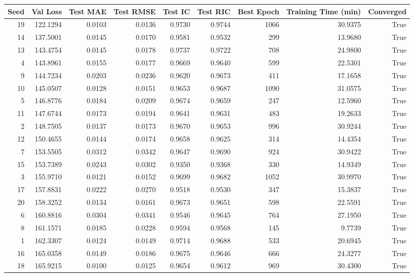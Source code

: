 \begin{tabular}{rrrrrrrrr}
\toprule
Seed & Val Loss & Test MAE & Test RMSE & Test IC & Test RIC & Best Epoch & Training Time (min) & Converged \\
\midrule
19 & 122.1294 & 0.0103 & 0.0136 & 0.9730 & 0.9744 & 1066 & 30.9375 & True \\
14 & 137.5001 & 0.0145 & 0.0170 & 0.9581 & 0.9532 & 299 & 13.9680 & True \\
13 & 143.4754 & 0.0145 & 0.0178 & 0.9737 & 0.9722 & 708 & 24.9800 & True \\
4 & 143.8961 & 0.0155 & 0.0177 & 0.9669 & 0.9640 & 599 & 22.5301 & True \\
9 & 144.7234 & 0.0203 & 0.0236 & 0.9620 & 0.9673 & 411 & 17.1658 & True \\
10 & 145.0507 & 0.0128 & 0.0151 & 0.9653 & 0.9687 & 1090 & 31.0575 & True \\
5 & 146.8776 & 0.0184 & 0.0209 & 0.9674 & 0.9659 & 247 & 12.5960 & True \\
11 & 147.6744 & 0.0173 & 0.0194 & 0.9641 & 0.9631 & 483 & 19.2633 & True \\
2 & 148.7505 & 0.0137 & 0.0173 & 0.9670 & 0.9653 & 996 & 30.9244 & True \\
12 & 150.4655 & 0.0144 & 0.0174 & 0.9658 & 0.9625 & 314 & 14.4354 & True \\
7 & 153.5505 & 0.0312 & 0.0342 & 0.9647 & 0.9690 & 924 & 30.9422 & True \\
15 & 153.7389 & 0.0243 & 0.0302 & 0.9350 & 0.9368 & 330 & 14.9349 & True \\
3 & 155.9710 & 0.0121 & 0.0152 & 0.9699 & 0.9682 & 1052 & 30.9970 & True \\
17 & 157.8831 & 0.0222 & 0.0270 & 0.9518 & 0.9530 & 347 & 15.3837 & True \\
20 & 158.3252 & 0.0134 & 0.0161 & 0.9673 & 0.9651 & 598 & 22.5591 & True \\
6 & 160.8816 & 0.0304 & 0.0341 & 0.9546 & 0.9645 & 764 & 27.1950 & True \\
8 & 161.1571 & 0.0185 & 0.0228 & 0.9594 & 0.9568 & 145 & 9.7739 & True \\
1 & 162.3307 & 0.0124 & 0.0149 & 0.9714 & 0.9688 & 533 & 20.6945 & True \\
16 & 165.0358 & 0.0149 & 0.0186 & 0.9675 & 0.9646 & 666 & 24.3277 & True \\
18 & 165.9215 & 0.0100 & 0.0125 & 0.9654 & 0.9612 & 969 & 30.4300 & True \\
\bottomrule
\end{tabular}
